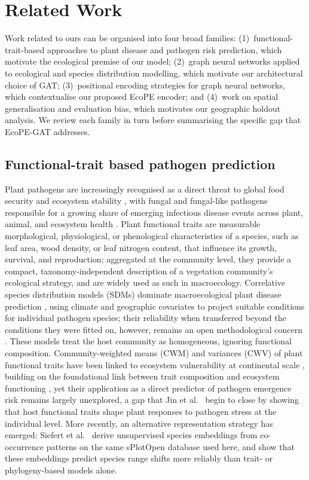 \documentclass[a4paper,fleqn]{cas-sc}
\begin{document}
\section{Related Work}
\label{sec:relwork}

Work related to ours can be organised into four broad families: (1)~functional-trait-based approaches to plant disease and pathogen risk prediction, which motivate the ecological premise of our model; (2)~graph neural networks applied to ecological and species distribution modelling, which motivate our architectural choice of GAT; (3)~positional encoding strategies for graph neural networks, which contextualise our proposed EcoPE encoder; and (4)~work on spatial generalisation and evaluation bias, which motivates our geographic holdout analysis. We review each family in turn before summarising the specific gap that EcoPE-GAT addresses.

\subsection{Functional-trait based pathogen prediction}

Plant pathogens are increasingly recognised as a direct threat to global food security and ecosystem stability \citep{bebber2014}, with fungal and fungal-like pathogens responsible for a growing share of emerging infectious disease events across plant, animal, and ecosystem health \citep{fisher2012}. Plant functional traits are measurable morphological, physiological, or phenological characteristics of a species, such as leaf area, wood density, or leaf nitrogen content, that influence its growth, survival, and reproduction; aggregated at the community level, they provide a compact, taxonomy-independent description of a vegetation community's ecological strategy, and are widely used as such in macroecology. Correlative species distribution models (SDMs) dominate macroecological plant disease prediction \citep{elith2009}, using climate and geographic covariates to project suitable conditions for individual pathogen species; their reliability when transferred beyond the conditions they were fitted on, however, remains an open methodological concern \citep{guillera2015}. These models treat the host community as homogeneous, ignoring functional composition. Community-weighted means (CWM) and variances (CWV) of plant functional traits have been linked to ecosystem vulnerability at continental scale \citep{bruelheide2018}, building on the foundational link between trait composition and ecosystem functioning \citep{lavorel2002}, yet their application as a direct predictor of pathogen emergence risk remains largely unexplored, a gap that Jin et al.~\citep{jin2021} begin to close by showing that host functional traits shape plant responses to pathogen stress at the individual level. More recently, an alternative representation strategy has emerged: Siefert et al.~\citep{siefert2024} derive unsupervised species embeddings from co-occurrence patterns on the same sPlotOpen database used here, and show that these embeddings predict species range shifts more reliably than trait- or phylogeny-based models alone.
\end{document}
